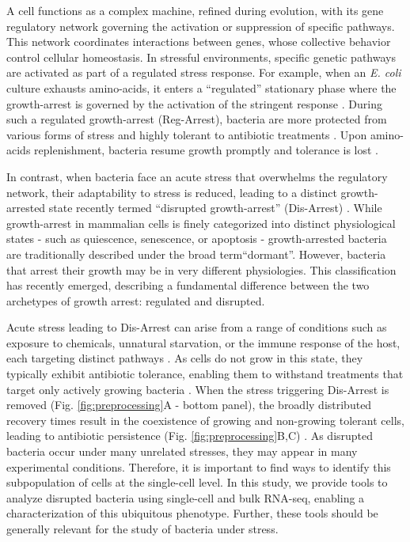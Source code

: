 \documentclass[12pt]{article}
\begin{document}
A cell functions as a complex machine, refined during evolution, with its gene regulatory network governing the activation or suppression of specific pathways. This network coordinates interactions between genes, whose collective behavior control cellular homeostasis. In stressful environments, specific genetic pathways are activated as part of a regulated stress response. For example, when an \textit{E. coli} culture exhausts amino-acids, it enters a ``regulated'' stationary phase where the growth-arrest is governed by the activation of the stringent response \cite{Potrykus2008}. During such a regulated growth-arrest (Reg-Arrest), bacteria are more protected from various forms of stress \cite{storz-hengge2010,Rittershaus2013} and highly tolerant to antibiotic treatments \cite{Lewis2007,Balaban2019,Ledger2023}. Upon amino-acids replenishment, bacteria resume growth promptly and tolerance is lost \cite{Gefen2014,Kolter2022}. 
\par
In contrast, when bacteria face an acute stress that overwhelms the regulatory network, their adaptability to stress is reduced, leading to a distinct growth-arrested state recently termed ``disrupted growth-arrest'' (Dis-Arrest) \cite{Kaplan2021}. While growth-arrest in mammalian cells is finely categorized into distinct physiological states - such as quiescence, senescence, or apoptosis - growth-arrested bacteria are traditionally described under the broad term``dormant''. However, bacteria that arrest their growth may be in very different physiologies. This classification has recently emerged, describing a fundamental difference between the two archetypes of growth arrest: regulated and disrupted\cite{Rotem2024}. \par 
Acute stress leading to Dis-Arrest can arise from a range of conditions such as exposure to chemicals, unnatural starvation, or the immune response of the host, each targeting distinct pathways \cite{Tosa1971,Kaplan2021,Ronneau2023,Dadole2024}. As cells do not grow in this state, they typically exhibit antibiotic tolerance, enabling them to withstand treatments that target only actively growing bacteria \cite{Lewis2007,Heinemann2016,Brauner2016,mcCall_Levin2019}. When the stress triggering Dis-Arrest is removed (Fig. \ref{fig:preprocessing}A - bottom panel), the broadly distributed recovery times result in the coexistence of growing and non-growing tolerant cells, leading to antibiotic persistence (Fig. \ref{fig:preprocessing}B,C) \cite{Balaban2004,Brauner2016}.  As disrupted bacteria occur under many unrelated stresses, they may appear in many experimental conditions. Therefore, it is important to find ways to identify this subpopulation of cells at the single-cell level. In this study, we provide tools to analyze disrupted bacteria using single-cell and bulk RNA-seq, enabling a characterization of this ubiquitous phenotype. Further, these tools should be generally relevant for the study of bacteria under stress.
\end{document}
